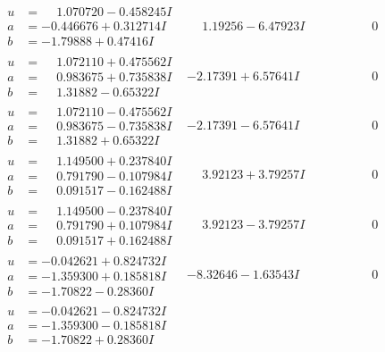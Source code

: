 \documentclass[1p]{elsarticle_modified}
\theoremstyle{definition}
\begin{document}
$$\begin{array}{c|c|c}
\begin{aligned}
u &= \phantom{-}1.070720 - 0.458245 I \\
a &= -0.446676 + 0.312714 I \\
b &= -1.79888 + 0.47416 I\end{aligned}
 & \phantom{-}1.19256 - 6.47923 I & \phantom{-0.000000 } 0 \\ \hline\begin{aligned}
u &= \phantom{-}1.072110 + 0.475562 I \\
a &= \phantom{-}0.983675 + 0.735838 I \\
b &= \phantom{-}1.31882 - 0.65322 I\end{aligned}
 & -2.17391 + 6.57641 I & \phantom{-0.000000 } 0 \\ \hline\begin{aligned}
u &= \phantom{-}1.072110 - 0.475562 I \\
a &= \phantom{-}0.983675 - 0.735838 I \\
b &= \phantom{-}1.31882 + 0.65322 I\end{aligned}
 & -2.17391 - 6.57641 I & \phantom{-0.000000 } 0 \\ \hline\begin{aligned}
u &= \phantom{-}1.149500 + 0.237840 I \\
a &= \phantom{-}0.791790 - 0.107984 I \\
b &= \phantom{-}0.091517 - 0.162488 I\end{aligned}
 & \phantom{-}3.92123 + 3.79257 I & \phantom{-0.000000 } 0 \\ \hline\begin{aligned}
u &= \phantom{-}1.149500 - 0.237840 I \\
a &= \phantom{-}0.791790 + 0.107984 I \\
b &= \phantom{-}0.091517 + 0.162488 I\end{aligned}
 & \phantom{-}3.92123 - 3.79257 I & \phantom{-0.000000 } 0 \\ \hline\begin{aligned}
u &= -0.042621 + 0.824732 I \\
a &= -1.359300 + 0.185818 I \\
b &= -1.70822 - 0.28360 I\end{aligned}
 & -8.32646 - 1.63543 I & \phantom{-0.000000 } 0 \\ \hline\begin{aligned}
u &= -0.042621 - 0.824732 I \\
a &= -1.359300 - 0.185818 I \\
b &= -1.70822 + 0.28360 I\end{aligned}

\end{array}$$
\end{document}

